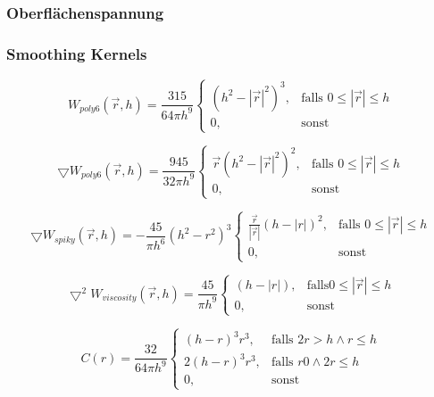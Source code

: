 \documentclass[a4paper]{paper}
\begin{document}
\subsubsection{Oberflächenspannung}
\subsubsection{Smoothing Kernels}



\begin{equation}
\label{poly6}
W_{poly6}(\vec{r},h) = \frac{315}{64 \pi h^9} 
\begin{cases}
(h^2-|\vec{r}|^2)^3, & \text{falls } 0 \leq |\vec{r}| \leq h \\
0, & \text{sonst}
\end{cases}
\end{equation}

\begin{equation}
\label{gradient_poly6}
\bigtriangledown W_{poly6}(\vec{r},h) = \frac{945}{32 \pi h^9} 
\begin{cases}
\vec{r}(h^2-|\vec{r}|^2)^2, &\text{falls } 0 \leq |\vec{r}| \leq h  \\
0, & \text{sonst}
\end{cases}
\end{equation}

\begin{equation}
\label{spiky}
\bigtriangledown W_{spiky}(\vec{r},h) = -\frac{45}{\pi h^6} (h^2-r^2)^3
\begin{cases}
 \frac{\vec{r}}{|\vec{r}|}(h-|r|)^2, & \text{falls } 0 \leq |\vec{r}| \leq h\\
0, & \text{sonst}
\end{cases}
\end{equation}

\begin{equation}
\label{viscosity}
\bigtriangledown^2 W_{viscosity}(\vec{r},h) = \frac{45}{\pi h^9} 
\begin{cases}
(h-|r|),& \text{falls} 0 \leq |\vec{r}| \leq h \\
0, & \text{sonst}
\end{cases}
\end{equation}

\begin{equation}
\label{surface}
C(r) = \frac{32}{64 \pi h^9}
\begin{cases}
(h-r)^3r^3,  &\text{falls }  2r > h \land r \leq h\\
2(h-r)^3r^3, &\text{falls } r  0 \land 2r \leq h\\
0,&\text{sonst}  
\end{cases}
\end{equation}
\end{document}
